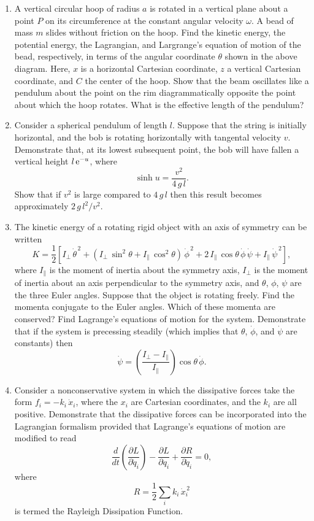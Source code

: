 {\begin{enumerate}
\epsfysize=1.75in
\centerline{}
\item A vertical circular hoop of radius $a$ is rotated in a vertical plane about a point $P$ on its
circumference at the constant angular velocity $\omega$. A bead of
mass $m$ slides without friction on the hoop. Find the kinetic energy, the potential energy, the Lagrangian, and Largrange's equation
of motion of the bead, respectively,  in terms of the angular coordinate $\theta$
shown in the above diagram. Here, $x$ is a horizontal Cartesian coordinate,
$z$ a vertical Cartesian coordinate, and $C$  the center of the hoop.
Show that the beam oscillates like a pendulum about the point on the
rim diagrammatically opposite the point about which the hoop
rotates. What is the effective length of the pendulum?

\item Consider a spherical pendulum of length $l$. Suppose that the string is initially horizontal, and the bob is rotating horizontally with tangental velocity $v$. Demonstrate that, at its lowest subsequent point, the bob will have fallen a vertical height $l\,{\rm e}^{-u}$,
where
$$
\sinh u = \frac{v^2}{4\,g\,l}.
$$
Show that if $v^2$ is large compared to $4\,g\,l$ then this result becomes approximately
$2\,g\,l^2/v^2$. 

\item The kinetic energy of a rotating rigid object with an axis of symmetry
can be written
$$
K = \frac{1}{2}\left[I_\perp\,\dot{\theta}^{\,2} + (I_\perp\,\sin^2\theta + I_\parallel\,\cos^2\theta)\,\dot{\phi}^{\,2} + 2\,I_\parallel\,\cos\theta\,\dot{\phi}\,\dot{\psi} + I_\parallel\,\dot{\psi}^{\,2}\right],
$$
where $I_\parallel$ is the  moment of inertia about the symmetry axis,
$I_\perp$ is the moment of inertia about an axis perpendicular to the symmetry axis, and $\theta$, $\phi$, $\psi$ are the three Euler angles.
Suppose that the object is rotating freely.
Find the momenta conjugate to the Euler angles. Which of these
momenta are conserved? Find Lagrange's equations of motion for the
system. Demonstrate that if the system is precessing steadily (which
implies that $\theta$, $\dot{\phi}$, and $\dot{\psi}$ are constants) then
$$
\dot{\psi} = \left(\frac{I_\perp-I_\parallel}{I_\parallel}\right)\cos\theta\,\dot{\phi}.
$$

\item Consider a nonconservative system in which the 
dissipative forces take the form $f_i = -k_i\,\dot{x}_i$, where the $x_i$
are Cartesian coordinates, and the $k_i$ are all positive. Demonstrate that
the dissipative forces can be incorporated into the Lagrangian formalism 
provided that Lagrange's equations of motion are modified to read
$$
\frac{d}{dt}\left(\frac{\partial L}{\partial \dot{q}_i}\right) - \frac{\partial L}{\partial q_i} + \frac{\partial R}{\partial \dot{q}_i}=0,
$$
where
$$
R = \frac{1}{2} \sum_i k_i\,\dot{x}_i^{\,2}
$$
is termed the Rayleigh Dissipation Function.
\end{enumerate}
}